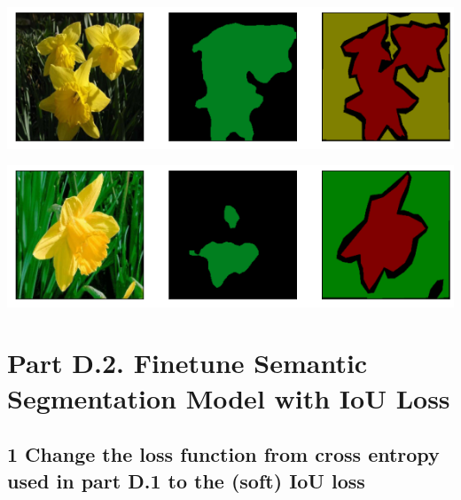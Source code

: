 \documentclass{article}
\begin{document}
\includegraphics[width=\textwidth]{D1-3.2.3.png}

\includegraphics[width=\textwidth]{D1-3.2.4.png}




\clearpage
\section*{Part D.2. Finetune Semantic Segmentation Model with IoU Loss}


\subsection*{1 Change the loss function from cross entropy used in part D.1 to the (soft) IoU loss}
\end{document}
